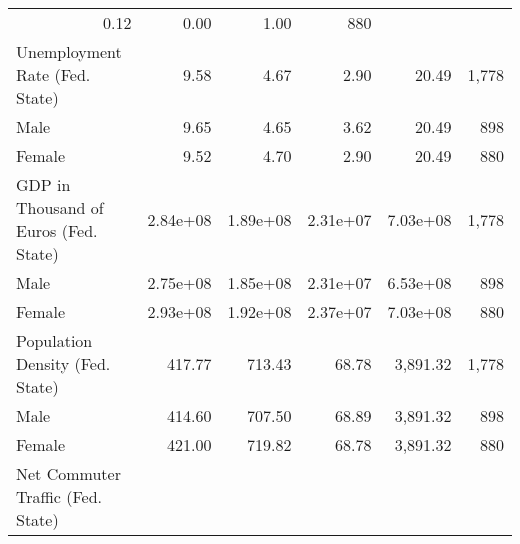 \documentclass{article}
\begin{document}
\begin{table}[!h]
{\begin{tabular}{llllll}
  \multicolumn{1}{r}{0.12} &
  \multicolumn{1}{r}{0.00} &
  \multicolumn{1}{r}{1.00} &
  \multicolumn{1}{r}{880} \\
\multicolumn{1}{l}{Unemployment Rate (Fed. State)} &
  \multicolumn{1}{r}{9.58} &
  \multicolumn{1}{r}{4.67} &
  \multicolumn{1}{r}{2.90} &
  \multicolumn{1}{r}{20.49} &
  \multicolumn{1}{r}{1,778} \\
\multicolumn{1}{l}{\hspace{1em}Male} &
  \multicolumn{1}{r}{9.65} &
  \multicolumn{1}{r}{4.65} &
  \multicolumn{1}{r}{3.62} &
  \multicolumn{1}{r}{20.49} &
  \multicolumn{1}{r}{898} \\
\multicolumn{1}{l}{\hspace{1em}Female} &
  \multicolumn{1}{r}{9.52} &
  \multicolumn{1}{r}{4.70} &
  \multicolumn{1}{r}{2.90} &
  \multicolumn{1}{r}{20.49} &
  \multicolumn{1}{r}{880} \\
\multicolumn{1}{l}{GDP in Thousand of Euros (Fed. State)} &
  \multicolumn{1}{r}{2.84e+08} &
  \multicolumn{1}{r}{1.89e+08} &
  \multicolumn{1}{r}{2.31e+07} &
  \multicolumn{1}{r}{7.03e+08} &
  \multicolumn{1}{r}{1,778} \\
\multicolumn{1}{l}{\hspace{1em}Male} &
  \multicolumn{1}{r}{2.75e+08} &
  \multicolumn{1}{r}{1.85e+08} &
  \multicolumn{1}{r}{2.31e+07} &
  \multicolumn{1}{r}{6.53e+08 } &           
  \multicolumn{1}{r}{898} \\
\multicolumn{1}{l}{\hspace{1em}Female} &
  \multicolumn{1}{r}{2.93e+08} &
  \multicolumn{1}{r}{1.92e+08} &
  \multicolumn{1}{r}{2.37e+07} &
  \multicolumn{1}{r}{7.03e+08} &
  \multicolumn{1}{r}{880} \\
\multicolumn{1}{l}{Population Density (Fed. State)} &
  \multicolumn{1}{r}{417.77} &
  \multicolumn{1}{r}{713.43} &
  \multicolumn{1}{r}{68.78} &
  \multicolumn{1}{r}{3,891.32} &
  \multicolumn{1}{r}{1,778} \\
\multicolumn{1}{l}{\hspace{1em}Male} &
  \multicolumn{1}{r}{414.60} &
  \multicolumn{1}{r}{707.50} &
  \multicolumn{1}{r}{68.89} &
  \multicolumn{1}{r}{3,891.32} &
  \multicolumn{1}{r}{898} \\
\multicolumn{1}{l}{\hspace{1em}Female} &
  \multicolumn{1}{r}{421.00} &
  \multicolumn{1}{r}{719.82} &
  \multicolumn{1}{r}{68.78} &
  \multicolumn{1}{r}{3,891.32} &
  \multicolumn{1}{r}{880} \\
\multicolumn{1}{l}{Net Commuter Traffic (Fed. State)} &

\end{tabular}}
\end{table}
\end{document}
